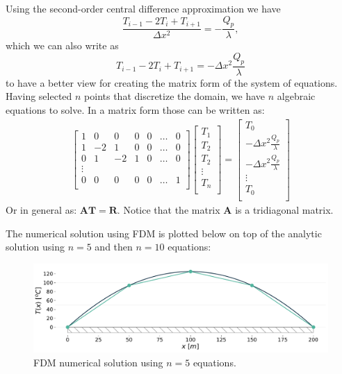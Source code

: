 Using the second-order central difference approximation we have
\begin{equation}
\frac{T_{i-1} - 2 T_i + T_{i+1}}{\Delta x^2} = - \frac{Q_p}{\lambda}, 
\end{equation}
which we can also write as 
\begin{equation}
T_{i-1} - 2 T_i + T_{i+1} = - \Delta x^2 \frac{Q_p}{\lambda}
\end{equation}
to have a better view for creating the matrix form of the system of equations. Having selected $n$ points that discretize the domain, we have $n$ algebraic equations to solve. In a matrix form those can be written as:
\begin{gather}
\begin{bmatrix}
1 & 0 & 0 & 0 & 0 & \dots & 0 \\
1 & -2 & 1 & 0 & 0 & \dots & 0 \\
0 & 1 & -2 & 1 & 0 & \dots & 0 \\
\vdots \\
0 & 0 & 0 & 0 & 0 & \dots & 1 \\
\end{bmatrix}
\begin{bmatrix}
T_1  \\
T_2 \\
T_2 \\
\vdots \\
T_n \\
\end{bmatrix}
=
\begin{bmatrix}
T_0  \\
- \Delta x^2 \frac{Q_p}{\lambda} \\
- \Delta x^2 \frac{Q_p}{\lambda} \\
\vdots \\
T_0 \\
\end{bmatrix}
\end{gather}
Or in general as: $\mathbf{A} \mathbf{T} = \mathbf{R}$. Notice that the matrix $\mathbf{A}$ is a tridiagonal matrix. 

The numerical solution using FDM is plotted below on top of the analytic solution using $n=5$ and then $n=10$ equations:

\begin{figure}[H]
\centering\includegraphics[width=12cm]{figures/example-heat-transfer-in-a-rod-FDM-n5.pdf}
\caption{FDM numerical solution using $n=5$ equations.}
\label{fig:FDM-solution}
\end{figure}

